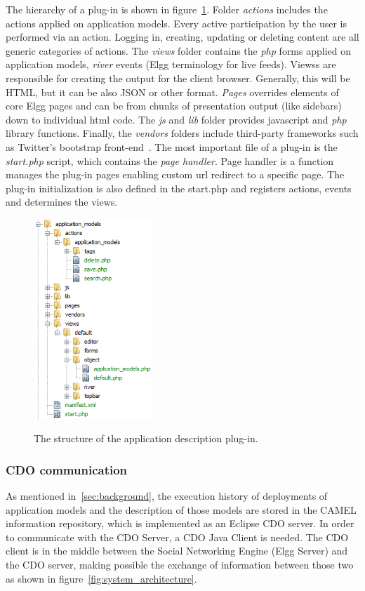 The hierarchy of a plug-in is shown in figure~\ref{fig:elgg_hierarchy}. 
Folder {\em actions} includes the actions applied on application models. Every active participation by the user is performed via an action. Logging in, creating, updating or deleting content are all generic categories of actions.
The {\em views} folder contains the {\em php} forms applied on application models, {\em river} events (Elgg terminology for live feeds). Viewss are responsible for creating the output for the client browser. Generally, this will be HTML, but it can be also JSON or other format. 
{\em Pages} overrides elements of core Elgg pages and can be from chunks of presentation output (like sidebars) down to individual html code.  
The {\em js} and {\em lib} folder provides javascript and {\em php} library functions. 
Finally, the {\em vendors} folders include third-party frameworks such as Twitter's bootstrap front-end~\cite{bootstrap_url}.
The most important file of a plug-in is the \emph{start.php} script, which contains the \emph{page handler}. Page handler is a function manages the plug-in pages enabling custom url redirect to a specific page. 
The plug-in initialization is also defined in the start.php and registers actions, events and determines the views. 

\begin{figure}[h]
	\caption{The structure of the application description plug-in.}
	\includegraphics[width=0.4\textwidth]{./fig/folder_hierarchy.png}
	\centering
	\label{fig:elgg_hierarchy}
\end{figure}

\subsubsection{CDO communication}
As mentioned in~\ref{sec:background}, the execution history of deployments of application models and the description of those models are stored in the CAMEL information repository, which is implemented as an Eclipse CDO server. In order to communicate with the CDO Server, a CDO Java Client is needed. The CDO client is in the middle between the Social Networking Engine (Elgg Server) and the CDO server, making possible the exchange of information between those two as shown in figure~\ref{fig:system_architecture}.


